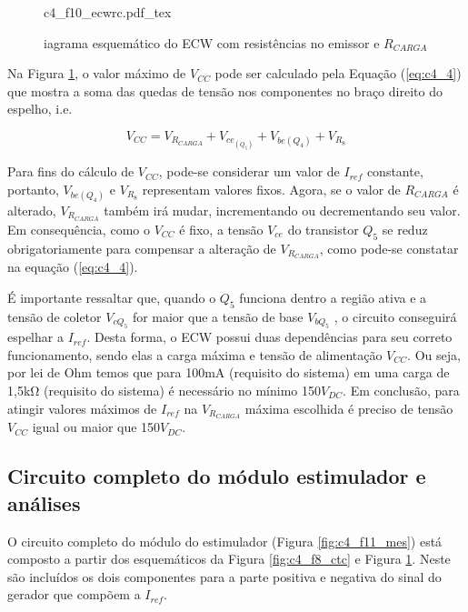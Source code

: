 \begin{figure}[h]
    \centering %
    \small %
    \def\svgwidth{0.7\columnwidth}%
    {c4_f10_ecwrc.pdf_tex}
    \caption{iagrama esquemático do \acrshort{ECW} com resistências no emissor e $R_{CARGA}$ \cite{NacimentoJunqueira2003EletroestimuladorDigital}}
    \label{fig:c4_f10_ecwrc}
\end{figure}

Na Figura \ref{fig:c4_f10_ecwrc}, o valor máximo de $V_{CC}$ pode ser calculado pela Equação (\ref{eq:c4_4}) que mostra a soma das quedas de tensão nos componentes no braço direito do espelho, i.e.

\begin{equation}
    V_{CC}= V_{R_{CARGA}} + V_{ce_{(Q_5)}} + V_{be{(Q_4)}} + V_{R_8}
    \label{eq:c4_4}
\end{equation}

Para fins do cálculo de $V_{CC}$, pode-se considerar um valor de $I_{ref}$ constante, portanto, $V_{be{(Q_4)}}$  e $V_{R_8}$  representam valores fixos. Agora, se o valor de $R_{CARGA}$ é alterado, $V_{R_{CARGA}}$ também irá mudar, incrementando ou decrementando seu valor. Em consequência, como o $V_{CC}$ é fixo, a tensão $V_{ce}$ do transistor $Q_5$ se reduz obrigatoriamente para compensar a alteração de $V_{R_{CARGA}}$, como pode-se constatar na equação (\ref{eq:c4_4}).

É importante ressaltar que, quando o $Q_5$ funciona dentro a região ativa e a tensão de coletor $V_{c{Q_5}}$ for maior que a tensão de base $V_{b{Q_5}}$ , o circuito conseguirá espelhar a $I_{ref}$. Desta forma, o \acrshort{ECW} possui duas dependências para seu correto funcionamento, sendo elas a carga máxima e tensão de alimentação $V_{CC}$. Ou seja, por lei de Ohm temos que para 100mA (requisito do sistema) em uma carga de 1,5k$\mathrm{\Omega}$ (requisito do sistema) é necessário no mínimo 150$V_{DC}$. Em conclusão, para atingir valores máximos de $I_{ref}$ na $V_{R_{CARGA}}$ máxima escolhida é preciso de tensão $V_{CC}$ igual ou maior que 150$V_{DC}$. 

\subsection*{Circuito completo do módulo estimulador e análises}
O circuito completo do módulo do estimulador (Figura \ref{fig:c4_f11_mes}) está composto a partir dos esquemáticos da Figura \ref{fig:c4_f8_ctc} e Figura \ref{fig:c4_f10_ecwrc}. Neste são incluídos os dois componentes para a parte positiva e negativa do sinal do gerador que compõem a $I_{ref}$.

